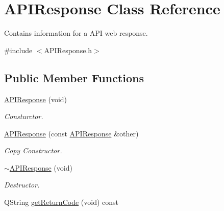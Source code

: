 \hypertarget{class_a_p_i_response}{}\section{A\+P\+I\+Response Class Reference}
\label{class_a_p_i_response}


Contains information for a A\+PI web response.  




{\ttfamily \#include $<$A\+P\+I\+Response.\+h$>$}

\subsection*{Public Member Functions}
\begin{DoxyCompactItemize}
\item 
\mbox{\label{class_a_p_i_response_a8819d39477f85cf49f9d951c3f20b48a}} 
\hyperlink{class_a_p_i_response_a8819d39477f85cf49f9d951c3f20b48a}{A\+P\+I\+Response} (void)
\begin{DoxyCompactList}\small\item\em Consturctor. \end{DoxyCompactList}\item 
\mbox{\label{class_a_p_i_response_ad9f5238fb178a139f7d90f0024c094bd}} 
\hyperlink{class_a_p_i_response_ad9f5238fb178a139f7d90f0024c094bd}{A\+P\+I\+Response} (const \hyperlink{class_a_p_i_response}{A\+P\+I\+Response} \&other)
\begin{DoxyCompactList}\small\item\em Copy Constructor. \end{DoxyCompactList}\item 
\mbox{\label{class_a_p_i_response_acd88184e036df13fb200120e545bd1aa}} 
\hyperlink{class_a_p_i_response_acd88184e036df13fb200120e545bd1aa}{$\sim$\+A\+P\+I\+Response} (void)
\begin{DoxyCompactList}\small\item\em Destructor. \end{DoxyCompactList}\item 
\mbox{\label{class_a_p_i_response_a0ac0de9b5ec19f313d1571936d88c2f1}} 
Q\+String \hyperlink{class_a_p_i_response_a0ac0de9b5ec19f313d1571936d88c2f1}{get\+Return\+Code} (void) const

\end{DoxyCompactItemize}
